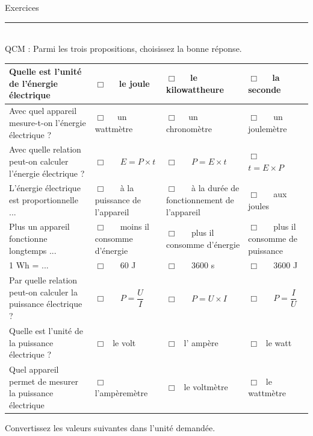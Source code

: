 \documentclass[11pt,a4paper]{article}
\begin{document}
\begin{center}
 \LARGE{Exercices } \\[3mm]
\end{center}



\normalsize

\hrule\
\\[0,5cm]


 QCM : Parmi les trois propositions, choisissez la bonne réponse. 

\vspace{2cm}
\begin{center}



    \begin{tabular}{|p{6cm}|C{3cm}|C{3cm}|C{3cm}|}
         \hline
        Quelle est l'unité de l'énergie électrique& $\Box $ ~~le joule & $\Box $ ~~le kilowattheure    & $\Box $ ~~la seconde \\
         \hline
       Avec quel appareil mesure-t-on l'énergie électrique ?  & $\Box $ ~~un wattmètre & $\Box $ ~~un chronomètre  & $\Box $ ~~ un joulemètre  \\
         \hline
         Avec quelle relation peut-on calculer l'énergie électrique ?  &$\Box $ ~~ $E= P \times t$  &$\Box $ ~~ $P=E \times t$  & $\Box $ ~~$t=E \times P$  \\
         \hline
          L'énergie électrique est proportionnelle ... & $\Box $ ~~ à la puissance de l'appareil & $\Box $ ~~ à la durée de fonctionnement de l'appareil & $\Box $ ~~ aux joules \\
         \hline
          Plus un appareil fonctionne longtemps ... &$\Box $ ~~ moins il consomme d'énergie & $\Box $ ~~ plus il consomme d'énergie & $\Box $ ~~ plus il consomme de puissance \\
         \hline
          1 Wh = ... & $\Box $ ~~ 60 J & $\Box $ ~~  3600 s & $\Box $ ~~  3600 J \\
         \hline
          Par quelle relation peut-on calculer la puissance électrique ? & $\Box $ ~~ $P=\dfrac{U}{I}$ & $\Box $ ~~ $P=U \times I$ &  $\Box $ ~~ $P=\dfrac{I}{U}$ \\
         \hline
          Quelle est l'unité de la puissance électrique ? &$\Box ~~ $ le volt &$\Box ~~ $ l' ampère &$\Box ~~ $ le watt \\
         \hline
          Quel appareil permet de mesurer la puissance électrique &$\Box ~~ $ l'ampèremètre &$\Box ~~ $ le voltmètre &$\Box ~~ $ le wattmètre \\
         \hline 

         
        
    \end{tabular}
\end{center}
\vfill
\newpage
{} Convertissez les valeurs suivantes dans l'unité demandée. \\
\end{document}
